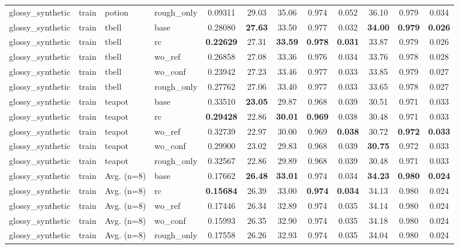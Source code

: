 \begin{table}[t]
{\begin{tabular}{llllcccccccc}
glossy\_synthetic & train & potion & rough\_only & 0.09311 & 29.03 & 35.06 & 0.974 & 0.052 & 36.10 & 0.979 & 0.034 \\
glossy\_synthetic & train & tbell & base & 0.28080 & \textbf{27.63} & 33.50 & 0.977 & 0.032 & \textbf{34.00} & \textbf{0.979} & \textbf{0.026} \\
glossy\_synthetic & train & tbell & rc & \textbf{0.22629} & 27.31 & \textbf{33.59} & \textbf{0.978} & \textbf{0.031} & 33.87 & 0.979 & 0.026 \\
glossy\_synthetic & train & tbell & wo\_ref & 0.26858 & 27.08 & 33.36 & 0.976 & 0.034 & 33.76 & 0.978 & 0.028 \\
glossy\_synthetic & train & tbell & wo\_conf & 0.23942 & 27.23 & 33.46 & 0.977 & 0.033 & 33.85 & 0.979 & 0.027 \\
glossy\_synthetic & train & tbell & rough\_only & 0.27762 & 27.06 & 33.40 & 0.977 & 0.033 & 33.65 & 0.978 & 0.027 \\
glossy\_synthetic & train & teapot & base & 0.33510 & \textbf{23.05} & 29.87 & 0.968 & 0.039 & 30.51 & 0.971 & 0.033 \\
glossy\_synthetic & train & teapot & rc & \textbf{0.29428} & 22.86 & \textbf{30.01} & \textbf{0.969} & 0.038 & 30.48 & 0.971 & 0.033 \\
glossy\_synthetic & train & teapot & wo\_ref & 0.32739 & 22.97 & 30.00 & 0.969 & \textbf{0.038} & 30.72 & \textbf{0.972} & \textbf{0.033} \\
glossy\_synthetic & train & teapot & wo\_conf & 0.29900 & 23.02 & 29.83 & 0.968 & 0.039 & \textbf{30.75} & 0.972 & 0.033 \\
glossy\_synthetic & train & teapot & rough\_only & 0.32567 & 22.86 & 29.89 & 0.968 & 0.039 & 30.48 & 0.971 & 0.033 \\
glossy\_synthetic & train & Avg. (n=8) & base & 0.17662 & \textbf{26.48} & \textbf{33.01} & 0.974 & 0.034 & \textbf{34.23} & \textbf{0.980} & \textbf{0.024} \\
glossy\_synthetic & train & Avg. (n=8) & rc & \textbf{0.15684} & 26.39 & 33.00 & \textbf{0.974} & \textbf{0.034} & 34.13 & 0.980 & 0.024 \\
glossy\_synthetic & train & Avg. (n=8) & wo\_ref & 0.17446 & 26.34 & 32.89 & 0.974 & 0.035 & 34.14 & 0.980 & 0.024 \\
glossy\_synthetic & train & Avg. (n=8) & wo\_conf & 0.15993 & 26.35 & 32.90 & 0.974 & 0.035 & 34.18 & 0.980 & 0.024 \\
glossy\_synthetic & train & Avg. (n=8) & rough\_only & 0.17558 & 26.26 & 32.93 & 0.974 & 0.035 & 34.04 & 0.980 & 0.024 \\

\end{tabular}}
\end{table}
